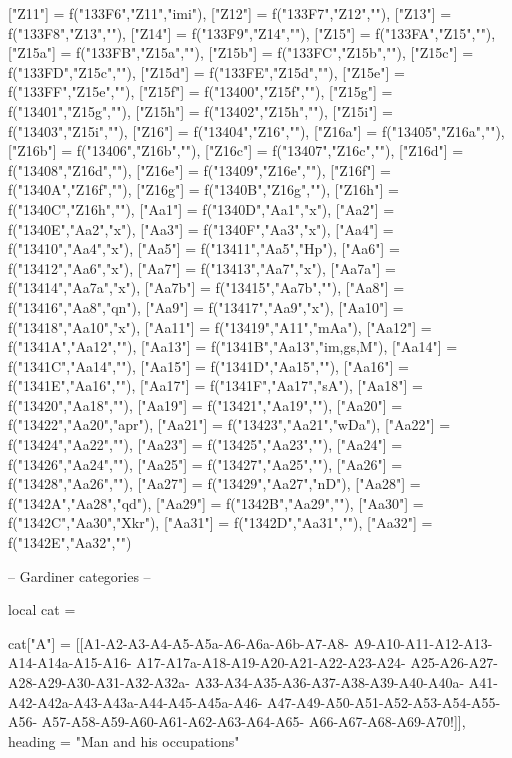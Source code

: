 \documentclass{article}
\begin{document}
\begin{luacode*}
{	["Z11"] = f("133F6","Z11","imi"),
 	["Z12"] = f("133F7","Z12",""),
 	["Z13"] = f("133F8","Z13",""),
 	["Z14"] = f("133F9","Z14",""),
 	["Z15"] = f("133FA","Z15",""),
 	["Z15a"] = f("133FB","Z15a",""),
 	["Z15b"] = f("133FC","Z15b",""),
 	["Z15c"] = f("133FD","Z15c",""),
 	["Z15d"] = f("133FE","Z15d",""),
 	["Z15e"] = f("133FF","Z15e",""),
 	["Z15f"] = f("13400","Z15f",""),
 	["Z15g"] = f("13401","Z15g",""),
 	["Z15h"] = f("13402","Z15h",""),
	["Z15i"] = f("13403","Z15i",""),
 	["Z16"] = f("13404","Z16",""),
 	["Z16a"] = f("13405","Z16a",""),
 	["Z16b"] = f("13406","Z16b",""),
 	["Z16c"] = f("13407","Z16c",""),
 	["Z16d"] = f("13408","Z16d",""),
 	["Z16e"] = f("13409","Z16e",""),
 	["Z16f"] = f("1340A","Z16f",""),
 	["Z16g"] 	= f("1340B","Z16g",""),
 	["Z16h"] 	= f("1340C","Z16h",""),
	["Aa1"] 	= f("1340D","Aa1","x"),
   	["Aa2"] = f("1340E","Aa2","x"),
	["Aa3"] = f("1340F","Aa3","x"),
	["Aa4"] = f("13410","Aa4","x"),
	["Aa5"] = f("13411","Aa5","Hp"),
	["Aa6"] = f("13412","Aa6","x"),
	["Aa7"] = f("13413","Aa7","x"),
	["Aa7a"] = f("13414","Aa7a","x"),
	["Aa7b"] = f("13415","Aa7b",""),
	["Aa8"] = f("13416","Aa8","qn"),
	["Aa9"] = f("13417","Aa9","x"),
	["Aa10"] = f("13418","Aa10","x"),
	["Aa11"] = f("13419","A11","mAa"),
	["Aa12"] = f("1341A","Aa12",""),
	["Aa13"] = f("1341B","Aa13","im,gs,M"),
	["Aa14"] = f("1341C","Aa14",""),
	["Aa15"] = f("1341D","Aa15",""),
	["Aa16"] = f("1341E","Aa16",""),
	["Aa17"] = f("1341F","Aa17","sA"),
	["Aa18"] = f("13420","Aa18",""),
	["Aa19"] = f("13421","Aa19",""),
	["Aa20"] = f("13422","Aa20","apr"),
	["Aa21"] = f("13423","Aa21","wDa"),
	["Aa22"] = f("13424","Aa22",""),
	["Aa23"] = f("13425","Aa23",""),
	["Aa24"] = f("13426","Aa24",""),
	["Aa25"] = f("13427","Aa25",""),
	["Aa26"] = f("13428","Aa26",""),
	["Aa27"] = f("13429","Aa27","nD"),
	["Aa28"] = f("1342A","Aa28","qd"),
	["Aa29"] = f("1342B","Aa29",""),
   ["Aa30"] = f("1342C","Aa30","Xkr"),
	["Aa31"] = f("1342D","Aa31",""),
	["Aa32"] = f("1342E","Aa32","")
}

-- Gardiner categories
--

local cat = {}

cat["A"]   =   {[[A1-A2-A3-A4-A5-A5a-A6-A6a-A6b-A7-A8-
                 A9-A10-A11-A12-A13-A14-A14a-A15-A16-
                 A17-A17a-A18-A19-A20-A21-A22-A23-A24-
                 A25-A26-A27-A28-A29-A30-A31-A32-A32a-
                 A33-A34-A35-A36-A37-A38-A39-A40-A40a-
                 A41-A42-A42a-A43-A43a-A44-A45-A45a-A46-
                 A47-A49-A50-A51-A52-A53-A54-A55-A56-
                 A57-A58-A59-A60-A61-A62-A63-A64-A65-
                 A66-A67-A68-A69-A70!]],
                 heading = "Man and his occupations"}


\end{luacode*}
\end{document}
